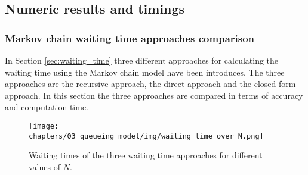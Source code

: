 \subsection{Numeric results and timings}\label{sec:truncation_effect}



\subsubsection{Markov chain waiting time approaches comparison}
\label{sec:waiting_time_approach_comparison}

In Section \ref{sec:waiting_time} three different approaches for calculating
the waiting time using the Markov chain model have been introduces.
The three approaches are the recursive approach, the direct approach and
the closed form approach.
In this section the three approaches are compared in terms of accuracy and
computation time.



\begin{figure}[H]
    \texttt{[image: chapters/03\_queueing\_model/img/waiting\_time\_over\_N.png]}
    \caption{Waiting times of the three waiting time approaches for different
    values of \(N\).}
    \label{fig:waiting_time_accuracy_over_N}
\end{figure}
    



